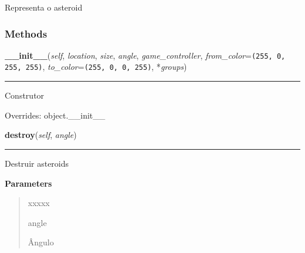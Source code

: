 Representa o asteroid



  \subsubsection{Methods}

    \vspace{0.5ex}

\hspace{.8\funcindent}\begin{boxedminipage}{\funcwidth}

    \raggedright \textbf{\_\_init\_\_}(\textit{self}, \textit{location}, \textit{size}, \textit{angle}, \textit{game\_controller}, \textit{from\_color}={\tt \texttt{(}255\texttt{, }0\texttt{, }255\texttt{, }255\texttt{)}}, \textit{to\_color}={\tt \texttt{(}255\texttt{, }0\texttt{, }0\texttt{, }255\texttt{)}}, *\textit{groups})

    \vspace{-1.5ex}

    \rule{\textwidth}{0.5\fboxrule}
\setlength{\parskip}{2ex}
    Construtor

\setlength{\parskip}{1ex}
      Overrides: object.\_\_init\_\_

    \end{boxedminipage}

    \label{pygame-asteroids:asteroid:Asteroid:destroy}

    \vspace{0.5ex}

\hspace{.8\funcindent}\begin{boxedminipage}{\funcwidth}

    \raggedright \textbf{destroy}(\textit{self}, \textit{angle})

    \vspace{-1.5ex}

    \rule{\textwidth}{0.5\fboxrule}
\setlength{\parskip}{2ex}
    Destruir asteroids

\setlength{\parskip}{1ex}
      \textbf{Parameters}
      \vspace{-1ex}

      \begin{quote}
        \begin{Ventry}{xxxxx}

          \item[angle]

          Ângulo

        \end{Ventry}

      \end{quote}

    \end{boxedminipage}

